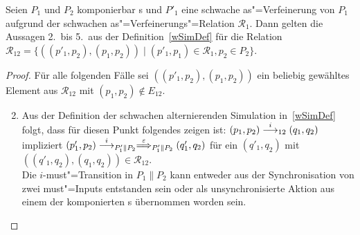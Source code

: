 \begin{Lem}
  \label{schwVerfParallelLem}
  Seien $P_1$ und $P_2$ komponierbar \MEIO{}s und $P'_1$ eine schwache
  as"=Verfeinerung von $P_1$ aufgrund der schwachen as"=Verfeinerungs"=Relation
  $\mathcal{R}_1$. Dann gelten die Aussagen 2.\ bis 5.\ aus der
  Definition~\ref{wSimDef} für die Relation $\mathcal{R}_{12} =
  \{((p'_1,p_2),(p_1,p_2))\mid (p'_1,p_1)\in\mathcal{R}_1, p_2\in P_2\}$.
\end{Lem}
\begin{proof}
  Für alle folgenden Fälle sei $((p'_1,p_2),(p_1,p_2))$ ein beliebig gewähltes
  Element aus $\mathcal{R}_{12}$ mit $(p_1,p_2)\notin E_{12}$.
  \begin{enumerate}
    \setcounter{enumi}{1}
    \item Aus der Definition der schwachen alternierenden
      Simulation in~\ref{wSimDef} folgt, dass für diesen Punkt folgendes zeigen
      ist: $(p_1,p_2)\must[i]_{12}(q_1,q_2)$ impliziert $(p'_1,p_2)
      \must[i]_{P'_1\|P_2} \weakmust[\varepsilon]_{P'_1\|P_2} (q'_1,q_2)$
      für ein $(q'_1,q_2)$ mit $((q'_1,q_2),(q_1,q_2)) \in \mathcal{R}_{12}$.\\
      Die $i$-must"=Transition in $P_1\|P_2$ kann entweder aus der
      Synchronisation von zwei must"=Inputs entstanden sein oder als
      unsynchronisierte Aktion aus einem der komponierten \MEIO{}s übernommen
      worden sein.
\end{enumerate}
\end{proof}
